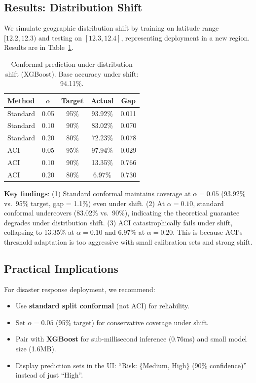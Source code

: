\documentclass{article}
\begin{document}
\subsection{Results: Distribution Shift}

We simulate geographic distribution shift by training on latitude range $[12.2, 12.3)$ and testing on $[12.3, 12.4]$, representing deployment in a new region. Results are in Table~\ref{tab:shift}.

\begin{table}[t]
\centering
\caption{Conformal prediction under distribution shift (XGBoost). Base accuracy under shift: 94.11\%.}
\label{tab:shift}
\small
\begin{tabular}{lcccc}
\toprule
\textbf{Method} & $\alpha$ & \textbf{Target} & \textbf{Actual} & \textbf{Gap} \\
\midrule
Standard & 0.05 & 95\% & 93.92\% & 0.011 \\
Standard & 0.10 & 90\% & 83.02\% & 0.070 \\
Standard & 0.20 & 80\% & 72.23\% & 0.078 \\
ACI & 0.05 & 95\% & 97.94\% & 0.029 \\
ACI & 0.10 & 90\% & 13.35\% & 0.766 \\
ACI & 0.20 & 80\% & 6.97\% & 0.730 \\
\bottomrule
\end{tabular}
\end{table}

\textbf{Key findings}: (1) Standard conformal maintains coverage at $\alpha=0.05$ (93.92\% vs.\ 95\% target, gap = 1.1\%) even under shift. (2) At $\alpha=0.10$, standard conformal undercovers (83.02\% vs.\ 90\%), indicating the theoretical guarantee degrades under distribution shift. (3) ACI catastrophically fails under shift, collapsing to 13.35\% at $\alpha=0.10$ and 6.97\% at $\alpha=0.20$. This is because ACI's threshold adaptation is too aggressive with small calibration sets and strong shift.

\subsection{Practical Implications}

For disaster response deployment, we recommend:
\begin{itemize}
    \item Use \textbf{standard split conformal} (not ACI) for reliability.
    \item Set $\alpha = 0.05$ (95\% target) for conservative coverage under shift.
    \item Pair with \textbf{XGBoost} for sub-millisecond inference (0.76ms) and small model size (1.6MB).
    \item Display prediction sets in the UI: ``Risk: \{Medium, High\} (90\% confidence)'' instead of just ``High''.
\end{itemize}
\end{document}
